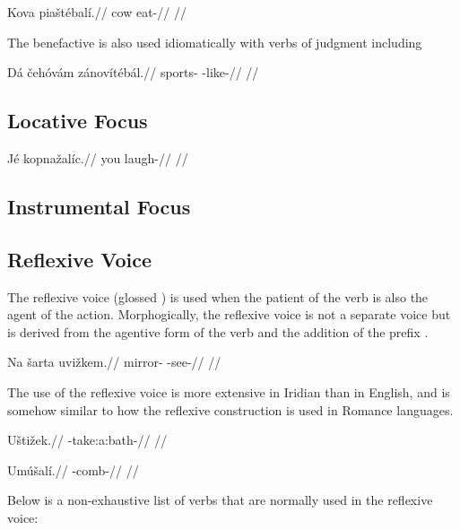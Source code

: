 \pex
\begingl
\gla Kova pia\v{s}t\'ebal\'i.//
\glb cow eat-//
\glft {}//
\endgl
\xe

The benefactive is also used idiomatically with verbs of judgment including  

\pex
\begingl
\gla D\'a \v{c}eh\'ov\'am z\'anov\'it\'eb\'al.//
\glb {} sports- -like-//
\glft {}//
\endgl
\xe

\subsection{Locative Focus}

\pex
\begingl
\gla J\'e kopna\v{z}al\'ic.//
\glb you laugh-//
\glft {}//
\endgl
\xe

\subsection{Instrumental Focus}


\subsection{Reflexive Voice}

The reflexive voice (glossed ) is used when the patient of the verb is also the agent of the action. Morphogically, the reflexive voice is not a separate voice but is derived from the agentive form of the verb and the addition of the prefix .

\pex
\begingl
\gla Na \v{s}arta uvi\v{z}kem.//
\glb {} mirror- -see-//
\glft {}//
\endgl
\xe

The use of the reflexive voice is more extensive in Iridian than in English, and is somehow similar to how the reflexive construction is used in Romance languages.

\pex
\begingl
\gla U\v{s}ti\v{z}ek.//
\glb {}-take:a:bath-//
\glft {}//
\endgl
\xe

\pex
\begingl
\gla Um\'u\v{s}al\'i.//
\glb {}-comb-//
\glft {}//
\endgl
\xe

Below is a non-exhaustive list of verbs that are normally used in the reflexive voice:
\bigskip

\noindent 
{} \\
 \\
 \\

